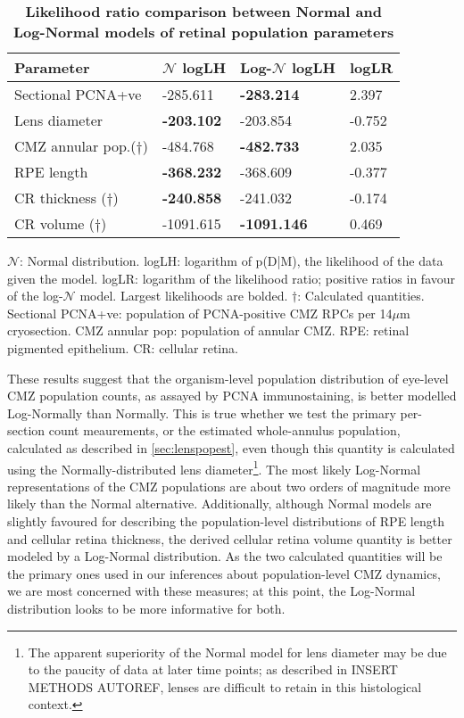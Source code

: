 \begin{table}[!ht]
    \centering
    \caption{
    {\bf Likelihood ratio comparison between Normal and Log-Normal models of retinal population parameters}}
    \begin{tabular}{|l|l|l|l|}
    \hline
    {\bf Parameter} & {\bf $\mathcal{N}$ logLH} & {\bf Log-$\mathcal{N}$ logLH} & {\bf logLR} \\ \hline
    Sectional PCNA+ve & -285.611 & {\bf -283.214} & 2.397\\ \hline
    Lens diameter & {\bf -203.102} & -203.854 & -0.752\\ \hline
    CMZ annular pop.($\dagger$)  & -484.768 & {\bf -482.733} & 2.035\\ \hline
    RPE length & {\bf -368.232} & -368.609 & -0.377\\ \hline
    CR thickness ($\dagger$) & {\bf -240.858} & -241.032 & -0.174\\ \hline
    CR volume ($\dagger$) & -1091.615 & {\bf -1091.146} & 0.469\\ \hline
    \end{tabular}
    \begin{flushleft} $\mathcal{N}$: Normal distribution. logLH: logarithm of p(D|M), the likelihood of the data given the model. logLR: logarithm of the likelihood ratio; positive ratios in favour of the log-$\mathcal{N}$ model. Largest likelihoods are bolded. $\dagger$: Calculated quantities. Sectional PCNA+ve: population of PCNA-positive CMZ RPCs per 14$\mu$m cryosection. CMZ annular pop: population of annular CMZ. RPE: retinal pigmented epithelium. CR: cellular retina.
    \end{flushleft}
    \label{PLHRtable}
\end{table}

These results suggest that the organism-level population distribution of eye-level CMZ population counts, as assayed by PCNA immunostaining, is better modelled Log-Normally than Normally. This is true whether we test the primary per-section count meaurements, or the estimated whole-annulus population, calculated as described in \autoref{sec:lenspopest}, even though this quantity is calculated using the Normally-distributed lens diameter\footnote{The apparent superiority of the Normal model for lens diameter may be due to the paucity of data at later time points; as described in INSERT METHODS AUTOREF, lenses are difficult to retain in this histological context.}. The most likely Log-Normal representations of the CMZ populations are about two orders of magnitude more likely than the Normal alternative. Additionally, although Normal models are slightly favoured for describing the population-level distributions of RPE length and cellular retina thickness, the derived cellular retina volume quantity is better modeled by a Log-Normal distribution. As the two calculated quantities will be the primary ones used in our inferences about population-level CMZ dynamics, we are most concerned with these measures; at this point, the Log-Normal distribution looks to be more informative for both.

